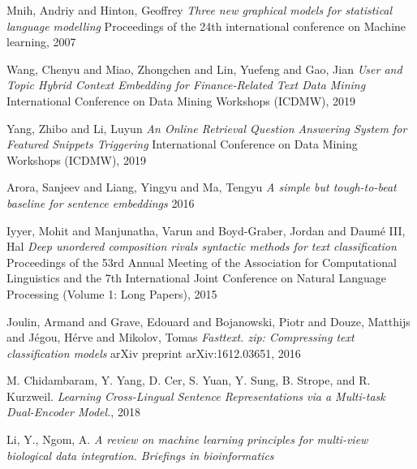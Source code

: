 \begin{thebibliography}{9}
Mnih, Andriy and Hinton, Geoffrey\newline
\textit{Three new graphical models for statistical language modelling}\newline
Proceedings of the 24th international conference on Machine learning, 2007

Wang, Chenyu and Miao, Zhongchen and Lin, Yuefeng and Gao, Jian\newline
\textit{User and Topic Hybrid Context Embedding for Finance-Related Text Data Mining} International Conference on Data Mining Workshops (ICDMW), 2019

Yang, Zhibo and Li, Luyun\newline
\textit{An Online Retrieval Question Answering System for Featured Snippets Triggering} International Conference on Data Mining Workshops (ICDMW), 2019

Arora, Sanjeev and Liang, Yingyu and Ma, Tengyu\newline
\textit{A simple but tough-to-beat baseline for sentence embeddings}
2016

Iyyer, Mohit and Manjunatha, Varun and Boyd-Graber, Jordan and Daum{\'e} III, Hal\newline
\textit{Deep unordered composition rivals syntactic methods for text classification}\newline
Proceedings of the 53rd Annual Meeting of the Association for Computational Linguistics and the 7th International Joint Conference on Natural Language Processing (Volume 1: Long Papers), 2015

Joulin, Armand and Grave, Edouard and Bojanowski, Piotr and Douze, Matthijs and J{\'e}gou, H{\'e}rve and Mikolov, Tomas\newline
\textit{Fasttext. zip: Compressing text classification models}\newline
arXiv preprint arXiv:1612.03651, 2016

M. Chidambaram, Y. Yang, D. Cer, S. Yuan, Y. Sung, B. Strope, and R. Kurzweil. \newline
\textit{Learning Cross-Lingual Sentence Representations via a Multi-task Dual-Encoder Model.}, 2018

Li, Y., Ngom, A.\newline
\textit{A review on machine learning principles for multi-view biological data integration. Briefings in bioinformatics}


\end{thebibliography}
